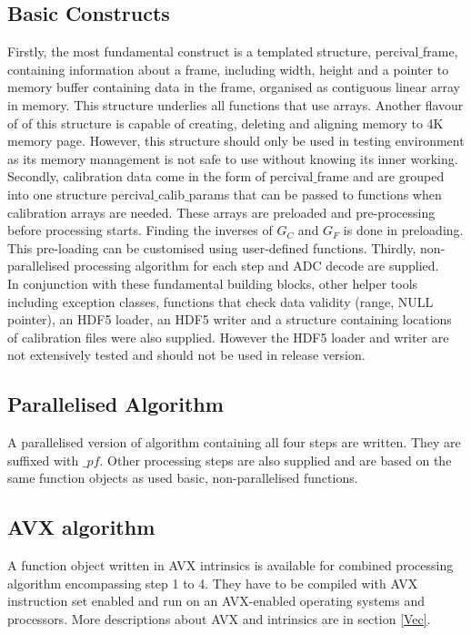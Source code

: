 \documentclass[journal]{IEEEtran}
\begin{document}
\subsection{Basic Constructs}
Firstly, the most fundamental construct is a templated structure, percival$\_$frame, containing information about a frame, including width, height and a pointer to memory buffer containing data in the frame, organised as contiguous linear array in memory. This structure underlies all functions that use arrays. Another flavour of of this structure is capable of creating, deleting and aligning memory to 4K memory page. However, this structure should only be used in testing environment as its memory management is not safe to use without knowing its inner working. Secondly, calibration data come in the form of percival$\_$frame and are grouped into one structure percival$\_$calib$\_$params that can be passed to functions when calibration arrays are needed. These arrays are preloaded and pre-processing before processing starts. Finding the inverses of $G_C$ and $G_F$ is done in preloading. This pre-loading can be customised using user-defined functions. Thirdly, non-parallelised processing algorithm for each step and ADC decode are supplied. \\
In conjunction with these fundamental building blocks, other helper tools including exception classes, functions that check data validity (range, NULL pointer), an HDF5 loader, an HDF5 writer and a structure containing locations of calibration files were also supplied. However the HDF5 loader and writer are not extensively tested and should not be used in release version. \\

\subsection{Parallelised Algorithm}
A parallelised version of algorithm containing all four steps are written. They are suffixed with $\_pf$. Other processing steps are also supplied and are based on the same function objects as used basic, non-parallelised functions.

\subsection{AVX algorithm}
A function object written in AVX intrinsics is available for combined processing algorithm encompassing step 1 to 4. They have to be compiled with AVX instruction set enabled and run on an AVX-enabled operating systems and processors. More descriptions about AVX and intrinsics are in section \ref{Vec}.
\end{document}
